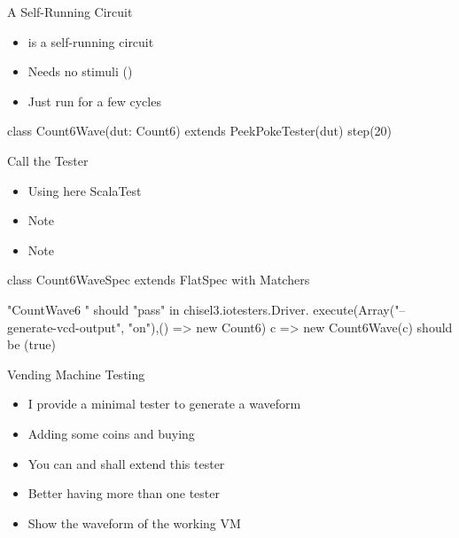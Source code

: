 \begin{frame}[fragile]{A Self-Running Circuit}
\begin{itemize}
\item {} is a self-running circuit
\item Needs no stimuli ()
\item Just run for a few cycles
\end{itemize}
\begin{chisel}
class Count6Wave(dut: Count6) extends PeekPokeTester(dut) {
  step(20)
}
\end{chisel}
\end{frame}

\begin{frame}[fragile]{Call the Tester}
\begin{itemize}
\item Using here ScalaTest
\item Note 
\item Note 
\end{itemize}
\begin{chisel}
class Count6WaveSpec extends
  FlatSpec with Matchers {
  
  "CountWave6 " should "pass" in {
    chisel3.iotesters.Driver.
    execute(Array("--generate-vcd-output", "on"),() => new Count6)
    { c => new Count6Wave(c) }
    should be (true)
  }
}
\end{chisel}
\end{frame}

\begin{frame}[fragile]{Vending Machine Testing}
\begin{itemize}
\item I provide a minimal tester to generate a waveform
\item Adding some coins and buying
\item You can and shall extend this tester
\item Better having more than one tester
\item Show the waveform of the working VM
\end{itemize}
\end{frame}



